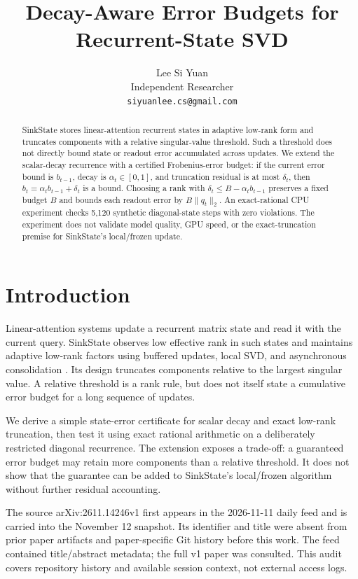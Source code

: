 \documentclass[11pt]{article}
\title{Decay-Aware Error Budgets for Recurrent-State SVD}
\author{Lee Si Yuan \\
  Independent Researcher \\
  \texttt{siyuanlee.cs@gmail.com}}
\begin{document}
\maketitle
\begin{abstract}
SinkState stores linear-attention recurrent states in adaptive low-rank form and truncates components with a relative singular-value threshold. Such a threshold does not directly bound state or readout error accumulated across updates. We extend the scalar-decay recurrence with a certified Frobenius-error budget: if the current error bound is $b_{t-1}$, decay is $\alpha_t\in[0,1]$, and truncation residual is at most $\delta_t$, then $b_t=\alpha_tb_{t-1}+\delta_t$ is a bound. Choosing a rank with $\delta_t\le B-\alpha_tb_{t-1}$ preserves a fixed budget $B$ and bounds each readout error by $B\|q_t\|_2$. An exact-rational CPU experiment checks 5,120 synthetic diagonal-state steps with zero violations. The experiment does not validate model quality, GPU speed, or the exact-truncation premise for SinkState's local/frozen update.
\end{abstract}

\section{Introduction}
Linear-attention systems update a recurrent matrix state and read it with the current query. SinkState observes low effective rank in such states and maintains adaptive low-rank factors using buffered updates, local SVD, and asynchronous consolidation \citep{jiang2026sinkstate}. Its design truncates components relative to the largest singular value. A relative threshold is a rank rule, but does not itself state a cumulative error budget for a long sequence of updates.

We derive a simple state-error certificate for scalar decay and exact low-rank truncation, then test it using exact rational arithmetic on a deliberately restricted diagonal recurrence. The extension exposes a trade-off: a guaranteed error budget may retain more components than a relative threshold. It does not show that the guarantee can be added to SinkState's local/frozen algorithm without further residual accounting.

The source arXiv:2611.14246v1 first appears in the 2026-11-11 daily feed and is carried into the November 12 snapshot. Its identifier and title were absent from prior paper artifacts and paper-specific Git history before this work. The feed contained title/abstract metadata; the full v1 paper was consulted. This audit covers repository history and available session context, not external access logs.
\end{document}
